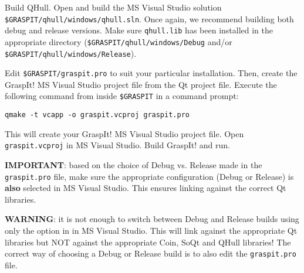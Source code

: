 Build QHull. Open and build the MS Visual Studio solution
\texttt{\$GRASPIT/qhull/windows/qhull.sln}. Once again, we recommend building
both debug and release versions. Make sure \texttt{qhull.lib} has been
installed in the appropriate directory
(\texttt{\$GRASPIT/qhull/windows/Debug}
and/or \texttt{\$GRASPIT/qhull/windows/Release}).

Edit \texttt{\$GRASPIT/graspit.pro} to suit your particular
installation. Then, create the GraspIt! MS Visual Studio project file
from the Qt project file. Execute the following command from inside
\texttt{\$GRASPIT} in a command prompt: 

\texttt{qmake -t vcapp -o graspit.vcproj graspit.pro}

This will create your GraspIt! MS Visual Studio project file. Open
\texttt{graspit.vcproj} in MS Visual Studio. Build GraspIt! and run.

\textbf{IMPORTANT}: 
based on the choice of Debug vs. Release made in
the \texttt{graspit.pro} file, make sure the appropriate configuration
(Debug or Release) is \textbf{also} selected in MS Visual Studio. This
ensures linking against the correct Qt libraries.

\textbf{WARNING}: it is not enough to switch between Debug and Release builds
using only the option in in MS Visual Studio. This will link against
the appropriate Qt libraries but NOT against the appropriate Coin,
SoQt and QHull libraries! The correct way of choosing a Debug or
Release build is to also edit the \texttt{graspit.pro} file.
